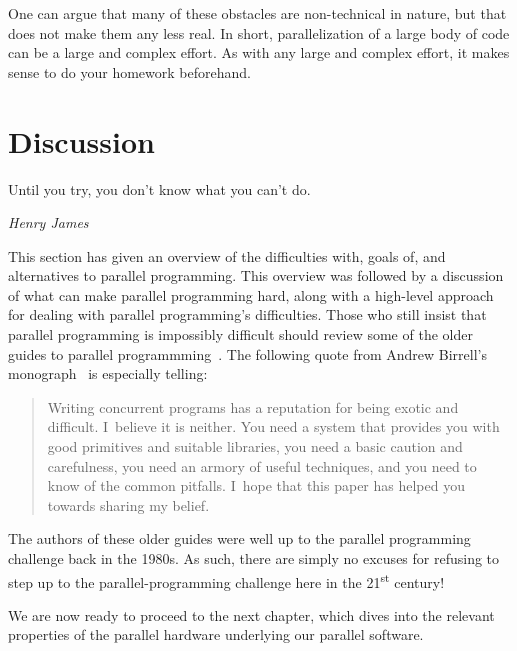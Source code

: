 {	One can argue that many of these obstacles are non-technical
	in nature, but that does not make them any less real.
	In short, parallelization of a large body of code
	can be a large and complex effort.
	As with any large and complex effort, it makes sense to
	do your homework beforehand.
}\QuickQuizEnd

\section{Discussion}
\label{sec:intro:Discussion}
%
\epigraph{Until you try, you don't know what you can't do.}
	 {\emph{Henry James}}

This section has given an overview of the difficulties with, goals of,
and alternatives to parallel programming.
This overview was followed by a discussion of
what can make parallel programming hard, along with a high-level
approach for dealing with parallel programming's difficulties.
Those who still insist that parallel programming is impossibly difficult
should review some of the older guides to parallel
programmming~\cite{SQNTParallel,AndrewDBirrell1989Threads,Beck85,Inman85}.
The following quote from Andrew Birrell's
monograph~\cite{AndrewDBirrell1989Threads} is especially telling:

\begin{quote}
	Writing concurrent programs has a reputation for being exotic
	and difficult. I~believe it is neither. You need a system
	that provides you with good primitives and suitable libraries,
	you need a basic caution and carefulness, you need an armory of
	useful techniques, and you need to know of the common pitfalls.
	I~hope that this paper has helped you towards sharing my belief.
\end{quote}

The authors of these older guides were well up to the parallel programming
challenge back in the 1980s.
As such, there are simply no excuses for refusing to step up to the
parallel-programming challenge here in the 21\textsuperscript{st} century!

We are now ready to proceed to the next chapter, which dives into the
relevant properties of the parallel hardware underlying our parallel
software.

